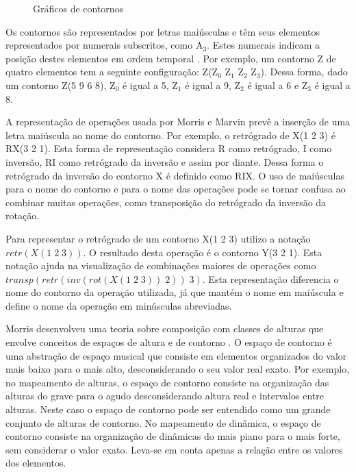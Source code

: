 \begin{figure}
  \centering
  \subfloat[contorno P(0 3 1 2)]{
    \texttt{[image: c-0312]}
    \label{fig:cseg-0312}
  }
  \subfloat[contorno Q(0 2 1 3)]{
    \texttt{[image: c-0213]}
    \label{fig:cseg-0213}
  }
  \subfloat[contorno R(2 0 3 1)]{
    \texttt{[image: c-2031]}
    \label{fig:cseg-2031}
  }
  \caption{Gráficos de contornos}
  \label{fig:graficos-cseg}
\end{figure}

Os contornos são representados por letras maiúsculas e têm seus
elementos representados por numerais subscritos, como A$_3$. Estes
numerais indicam a posição destes elementos em ordem temporal
\cite{marvin.ea87:relating}. Por exemplo, um contorno Z de quatro
elementos tem a seguinte configuração: Z(Z$_0$ Z$_1$ Z$_2$
Z$_3$). Dessa forma, dado um contorno Z(5 9 6 8), Z$_0$ é igual a 5,
Z$_1$ é igual a 9, Z$_2$ é igual a 6 e Z$_3$ é igual a 8.

A representação de operações usada por Morris e Marvin prevê a
inserção de uma letra maiúscula ao nome do contorno. Por exemplo, o
retrógrado de X(1 2 3) é RX(3 2 1). Esta forma de representação
considera R como retrógrado, I como inversão, RI como retrógrado da
inversão e assim por diante. Dessa forma o retrógrado da inversão do
contorno X é definido como RIX. O uso de maiúsculas para o nome do
contorno e para o nome das operações pode se tornar confusa ao
combinar muitas operações, como transposição do retrógrado da inversão
da rotação.

Para representar o retrógrado de um contorno X(1 2 3) utilizo a
notação $retr(X(1\;2\;3))$. O resultado desta operação é o contorno
Y(3 2 1). Esta notação ajuda na visualização de combinações maiores de
operações como $transp(retr(inv(rot(X(1\;2\;3))\;2))\;3)$. Esta
representação diferencia o nome do contorno da operação utilizada, já
que mantém o nome em maiúscula e define o nome da operação em
minúsculas abreviadas.

Morris desenvolveu uma teoria sobre composição com classes de alturas
que envolve conceitos de espaços de altura e de contorno
\cite[p. 3]{morris87:composition}. O espaço de contorno é uma
abstração de espaço musical que consiste em elementos organizados do
valor mais baixo para o mais alto, desconsiderando o seu valor real
exato. Por exemplo, no mapeamento de alturas, o espaço de contorno
consiste na organização das alturas do grave para o agudo
desconsiderando altura real e intervalos entre alturas. Neste caso o
espaço de contorno pode ser entendido como um grande conjunto de
alturas de contorno. No mapeamento de dinâmica, o espaço de contorno
consiste na organização de dinâmicas do mais piano para o mais forte,
sem considerar o valor exato. Leva-se em conta apenas a relação entre
os valores dos elementos.

